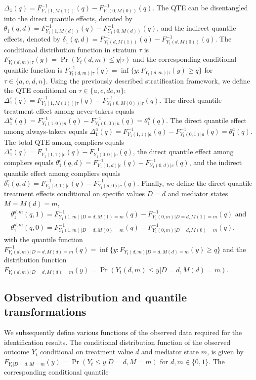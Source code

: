 \documentclass[a4paper,12pt]{article}
\begin{document}
 \doublespacing \pagestyle{plain}
$\Delta_1(q) = F_{Y_1(1,M(1))}^{-1}(q) -F_{Y_1(0,M(0))}^{-1}(q)$.
The QTE can be disentangled into the direct quantile effects, denoted by $\theta_1(q,d) = F_{Y_1(1,M(d))}^{-1}(q) -F_{Y_1(0,M(d))}^{-1}(q)$, and the indirect quantile effects, denoted by $\delta_1(q,d) = F_{Y_1(d,M(1))}^{-1}(q) -F_{Y_1(d,M(0))}^{-1}(q)$.
The conditional distribution function in stratum $\tau$ is $F_{Y_{t}(d,m)|\tau}(y) = \Pr(Y_t(d,m) \leq y |\tau)$ and the corresponding conditional quantile function is $F_{Y_t(d,m)|\tau}^{-1}(q) = \inf \{y : F_{Y_{t}(d,m)|\tau}(y) \geq q \}$ for $\tau \in \{a,c,d,n\}$. Using the previously described stratification framework, we define the QTE conditional on $\tau \in \{a,c,de,n\}$: $\Delta_1^{\tau}(q) = F_{Y_1(1,M(1))|\tau}^{-1}(q)-F_{Y_1(0,M(0))|\tau}^{-1}(q)$. The direct quantile treatment effect among never-takers equals $\Delta_1^{n} (q)= F_{Y_1(1,0)|n}^{-1}(q)-F_{Y_1(0,0)|n}^{-1}(q) =\theta_1^{n}(q)$. The direct quantile effect among always-takers equals $\Delta_1^{a} (q)= F_{Y_1(1,1)|a}^{-1}(q)-F_{Y_1(0,1)|a}^{-1}(q) =\theta_1^{a}(q)$. The total QTE among compliers equals $\Delta_1^{c}(q) = F_{Y_1(1,1)|c}^{-1}(q)-F_{Y_1(0,0)|c}^{-1}(q)$, the direct quantile effect among compliers equals $\theta_1^{c}(q,d) = F_{Y_1(1,d)|c}^{-1}(q)-F_{Y_1(0,d)|c}^{-1}(q)$, and the indirect quantile effect among compliers equals $\delta_1^{c}(q,d) = F_{Y_1(d,1)|c}^{-1}(q)-F_{Y_1(d,0)|c}^{-1}(q)$. Finally, we define the direct quantile treatment effects conditional on specific values $D=d$ and mediator states $M=M(d)=m$,
\begin{align*}
\theta_1^{d,m}(q,1)=F_{Y_1(1,m)|D=d,M(1)=m}^{-1}(q)-F_{Y_1(0,m)|D=d,M(1)=m}^{-1}(q) \mbox{ and} \\
\theta_1^{d,m}(q,0)=F_{Y_1(1,m)|D=d,M(0)=m}^{-1}(q)-F_{Y_1(0,m)|D=d,M(0)=m}^{-1}(q),
\end{align*}
with the quantile function $F_{Y_t(d,m)|D=d,M(d)=m}^{-1}(q) = \inf \{y : F_{Y_{t}(d,m)|D=d,M(d)=m}(y) \geq q \}$ and the distribution function $F_{Y_{t}(d,m)|D=d,M(d)=m}(y) = \Pr(Y_t(d,m) \leq y |D=d,M(d)=m)$.
\subsection{Observed distribution and quantile transformations}
We subsequently define various functions of the observed data required for the identification results. The conditional distribution function of the observed outcome $Y_t$ conditional on treatment value $d$ and mediator state $m$, is given by $F_{Y_{t}|D=d,M=m}(y) = \Pr(Y_t \leq y |D=d,M=m)$ for $d,m \in \{0,1\}$. The corresponding conditional quantile 
\end{document}
